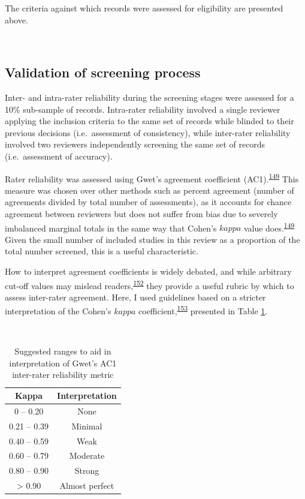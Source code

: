 \documentclass[a4paper, twoside]{templates/ociamthesis}
\begin{document}
The criteria against which records were assessed for eligibility are presented above.

~

\hypertarget{validation-of-screening-process}{%
\subsection{Validation of screening process}\label{validation-of-screening-process}}

Inter- and intra-rater reliability during the screening stages were assessed for a 10\% sub-sample of records. Intra-rater reliability involved a single reviewer applying the inclusion criteria to the same set of records while blinded to their previous decisions (i.e.~assessment of consistency), while inter-rater reliability involved two reviewers independently screening the same set of records (i.e.~assessment of accuracy).

Rater reliability was assessed using Gwet's agreement coefficient (AC1).\textsuperscript{\protect\hyperlink{ref-gwet2008}{149}} This measure was chosen over other methods such as percent agreement (number of agreements divided by total number of assessments), as it accounts for chance agreement between reviewers but does not suffer from bias due to severely imbalanced marginal totals in the same way that Cohen's \(kappa\) value does.\textsuperscript{\protect\hyperlink{ref-gwet2008}{149}} Given the small number of included studies in this review as a proportion of the total number screened, this is a useful characteristic.

How to interpret agreement coefficients is widely debated, and while arbitrary cut-off values may mislead readers,\textsuperscript{\protect\hyperlink{ref-brennan1992}{152}} they provide a useful rubric by which to assess inter-rater agreement. Here, I used guidelines based on a stricter interpretation of the Cohen's \(kappa\) coefficient,\textsuperscript{\protect\hyperlink{ref-mchugh2012}{153}} presented in Table \ref{tab:gwet-table}.

~





\begin{table}[H]

\caption[Ranges for Gwet's AC1]{\label{tab:gwet-table}Suggested ranges to aid in interpretation of Gwet's AC1 inter-rater reliability metric}
\centering
\begin{tabular}[t]{cc}
\toprule
\textbf{Kappa} & \textbf{Interpretation}\\
\midrule
0    – 0.20 & None\\
\midrule
0.21 – 0.39 & Minimal\\
\midrule
0.40 – 0.59 & Weak\\
\midrule
0.60 – 0.79 & Moderate\\
\midrule
0.80 – 0.90 & Strong\\
\midrule
\addlinespace
> 0.90 & Almost perfect\\
\bottomrule
\end{tabular}
\end{table}
\end{document}
